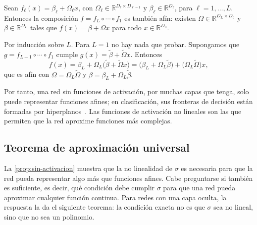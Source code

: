 \begin{proposicion}\label{prop:sin-activacion}
Sean $f_\ell(x) = \beta_\ell + \Omega_\ell x$, con $\Omega_\ell \in \mathbb{R}^{D_\ell \times D_{\ell-1}}$ y $\beta_\ell \in \mathbb{R}^{D_\ell}$, para $\ell = 1, \dots, L$. Entonces la composición $f = f_L \circ \cdots \circ f_1$ es también afín: existen $\Omega \in \mathbb{R}^{D_L \times D_0}$ y $\beta \in \mathbb{R}^{D_L}$ tales que $f(x) = \beta + \Omega x$ para todo $x \in \mathbb{R}^{D_0}$.
\end{proposicion}

\begin{demostracion}
Por inducción sobre $L$. Para $L = 1$ no hay nada que probar. Supongamos que $g = f_{L-1} \circ \cdots \circ f_1$ cumple $g(x) = \widetilde{\beta} + \widetilde{\Omega}x$. Entonces
\[
  f(x) = \beta_L + \Omega_L\bigl(\widetilde{\beta} + \widetilde{\Omega}x\bigr)
       = \bigl(\beta_L + \Omega_L\widetilde{\beta}\bigr) + \bigl(\Omega_L\widetilde{\Omega}\bigr)x,
\]
que es afín con $\Omega = \Omega_L\widetilde{\Omega}$ y $\beta = \beta_L + \Omega_L\widetilde{\beta}$.
\end{demostracion}

\begin{observacion}
Por tanto, una red sin funciones de activación, por muchas capas que tenga, solo puede representar funciones afines; en clasificación, sus fronteras de decisión están formadas por hiperplanos~\cite[cap.~6]{goodfellow2016deep}. Las funciones de activación no lineales son las que permiten que la red aproxime funciones más complejas.
\end{observacion}

\subsection{Teorema de aproximación universal}\label{sec:aprox-universal}

La \cref{prop:sin-activacion} muestra que la no linealidad de $\sigma$ es necesaria para que la red pueda representar algo más que funciones afines. Cabe preguntarse si también es suficiente, es decir, qué condición debe cumplir $\sigma$
para que una red pueda aproximar cualquier función continua. Para redes con una capa oculta, la respuesta la da el siguiente teorema: la condición exacta no es que $\sigma$ sea no lineal, sino que no sea un polinomio.

